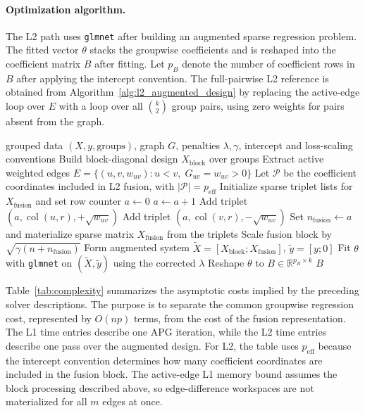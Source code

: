 \documentclass[twoside,11pt]{article}
\newcommand{\R}{\mathbb{R}}
\begin{document}
\paragraph{Optimization algorithm.}
The L2 path uses \texttt{glmnet} after building an augmented sparse regression
problem. The fitted vector $\theta$ stacks the groupwise coefficients and is
reshaped into the coefficient matrix $B$ after fitting. Let $p_B$ denote the
number of coefficient rows in $B$ after applying the intercept convention.
The full-pairwise L2 reference is obtained from
Algorithm~\ref{alg:l2_augmented_design} by replacing the active-edge loop over
$E$ with a loop over all $\binom{k}{2}$ group pairs, using zero weights for
pairs absent from the graph.
\begin{algorithm}[t]
\caption{L2 Augmented-Design Solver with \texttt{glmnet}}
\label{alg:l2_augmented_design}
\begin{algorithmic}[1]
\Require grouped data $(X,y,\mathrm{groups})$, graph $G$, penalties $\lambda,\gamma$, intercept and loss-scaling conventions
\State Build block-diagonal design $X_{\mathrm{block}}$ over groups
\State Extract active weighted edges $E=\{(u,v,w_{uv}):u<v,\;G_{uv}=w_{uv}>0\}$
\State Let $\mathcal P$ be the coefficient coordinates included in L2 fusion,
with $|\mathcal P|=p_{\mathrm{eff}}$
\State Initialize sparse triplet lists for $X_{\mathrm{fusion}}$ and set row
counter $a\gets 0$
    \State $a\gets a+1$
    \State Add triplet $(a,\operatorname{col}(u,r),+\sqrt{w_{uv}})$
    \State Add triplet $(a,\operatorname{col}(v,r),-\sqrt{w_{uv}})$
  \EndFor
\EndFor
\State Set $n_{\mathrm{fusion}}\gets a$ and materialize sparse matrix
$X_{\mathrm{fusion}}$ from the triplets
\State Scale fusion block by $\sqrt{\gamma(n+n_{\mathrm{fusion}})}$
\State Form augmented system $\tilde X=[X_{\mathrm{block}};X_{\mathrm{fusion}}]$, $\tilde y=[y;0]$
\State Fit $\theta$ with \texttt{glmnet} on $(\tilde X,\tilde y)$ using the corrected $\lambda$
\State Reshape $\theta$ to $B\in\R^{p_B\times k}$
\State \Return $B$
\end{algorithmic}
\end{algorithm}

Table~\ref{tab:complexity} summarizes the asymptotic costs implied by the
preceding solver descriptions. The purpose is to separate the common
groupwise regression cost, represented by $O(np)$ terms, from the cost of the
fusion representation. The L1 time entries describe one APG iteration, while
the L2 time entries describe one pass over the augmented design. For L2, the table
uses $p_{\mathrm{eff}}$ because the intercept convention determines how many
coefficient coordinates are included in the fusion block. The active-edge L1
memory bound assumes the block processing described above, so edge-difference
workspaces are not materialized for all $m$ edges at once.
\end{document}

